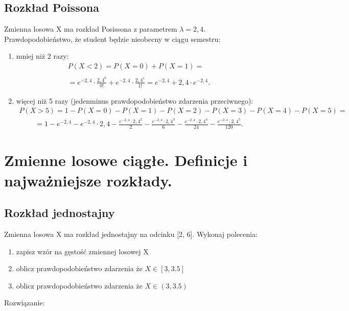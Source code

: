 \documentclass[12pt]{article}
\begin{document}
    \subsection{Rozkład Poissona}
    \begin{exercise}
        Zmienna losowa X ma rozkład Posissona z parametrem $\lambda = 2,4$. Prawdopodobieństwo, że student będzie nieobecny w ciągu semestru:
    \end{exercise}
    \begin{enumerate}
        \item mniej niż 2 razy:
        \begin{align*}
            P(X<2)=P(X=0)+P(X=1)=\\\\
            =e^{-2,4}\cdot\frac{2,4^0}{0!}+e^{-2,4}\cdot\frac{2,4^1}{1!}=e^{-2,4}+2,4\cdot e^{-2,4}.
        \end{align*}
        \item więcej niż 5 razy (jedenminus prawdopodobieństwo zdarzenia przeciwnego):
        \begin{align*}
            P(X>5)=1-P(X=0)-P(X=1)-P(X=2)-P(X=3)-P(X=4)-P(X=5)=
        \end{align*}
        \begin{align*}
            =1-e^{-2,4}-e^{-2,4}\cdot2,4-\frac{e^{-2,4}\cdot2,4^2}{2}-\frac{e^{-2,4}\cdot2,4^3}{6}-\frac{e^{-2,4}\cdot2,4^4}{24}-\frac{e^{-2,4}\cdot2,4^5}{120}.
        \end{align*}

    \end{enumerate}



    \newpage

    \section{Zmienne losowe ciągłe. Definicje i najważniejsze rozkłady.}

    \subsection{Rozkład jednostajny}
    \begin{exercise}
        Zmienna losowa X ma rozkład jednostajny na odcinku [2, 6]. Wykonaj
        polecenia:
        \begin{enumerate}
            \item zapisz wzór na gęstość zmiennej losowej X
            \item oblicz prawdopodobieństwo zdarzenia że $X\in[3,3.5]$
            \item oblicz prawdopodobieństwo zdarzenia że $X \in (3,3.5)$
        \end{enumerate}
    \end{exercise}
    Rozwiązanie:
\end{document}
